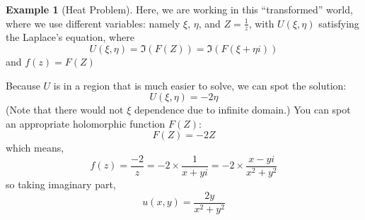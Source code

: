 \documentclass[a4paper, 12pt]{article}
\theoremstyle{definition}
\newtheorem{example}{Example}
\numberwithin{theorem}{section}
\numberwithin{definition}{section}
\numberwithin{exercise}{section}
\numberwithin{remark}{section}
\numberwithin{figure}{section}
\numberwithin{example}{section}
\begin{document}
\begin{example}[Heat Problem]
    Here, we are working in this ``transformed'' world, where we use different variables:
    namely $\xi$, $\eta$, and $Z = \frac{1}{z}$,
    with $U\left( \xi, \eta \right)$ satisfying the Laplace's equation, where
    \begin{equation*}
        U\left( \xi, \eta \right) = \Im \left( F(Z) \right) = \Im \left( F\left( \xi + \eta i \right) \right)
    \end{equation*}
    and $f(z) = F(Z)$

    Because $U$ is in a region that is much easier to solve, we can spot the solution:
    \begin{equation*}
        U\left( \xi, \eta \right) = -2 \eta
    \end{equation*}
    (Note that there would not $\xi$ dependence due to infinite domain.)
    You can spot an appropriate holomorphic function $F(Z)$:
    \begin{equation*}
        F(Z) = -2 Z
    \end{equation*}
    which means,
    \begin{equation*}
        f(z) = \frac{-2}{z} = -2 \times \frac{1}{x + yi} = -2 \times \frac{x-yi}{x^2 + y^2}
    \end{equation*}
    so taking imaginary part,
    \begin{equation*}
        u(x,y) = \frac{2y}{x^2 + y^2}
    \end{equation*}
\end{example}
\end{document}
